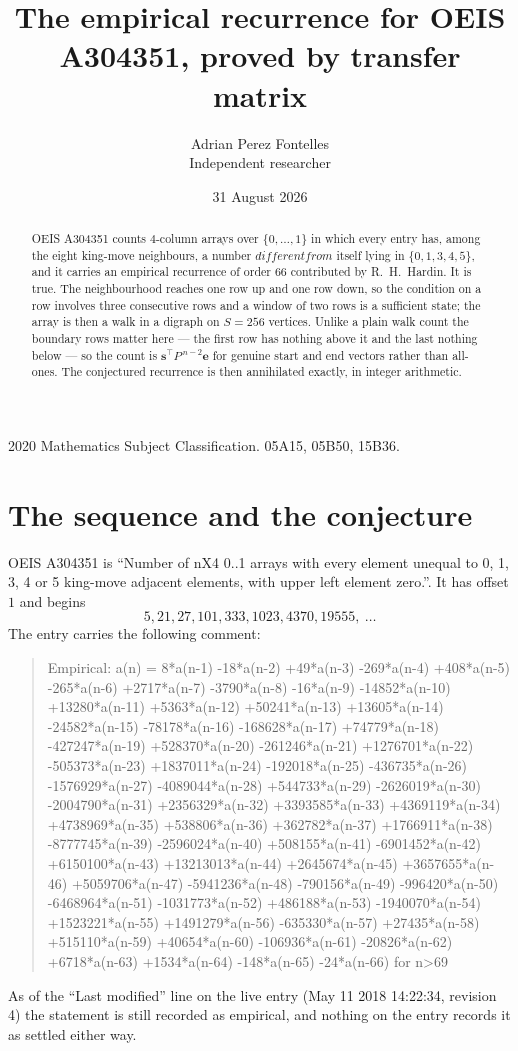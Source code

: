 \documentclass[11pt,a4paper]{article}
\title{The empirical recurrence for OEIS A304351, proved by transfer matrix}
\author{Adrian Perez Fontelles\\ \small Independent researcher}
\date{31 August 2026}
\theoremstyle{plain}
\theoremstyle{definition}
\begin{document}
\maketitle

\begin{abstract}
OEIS A304351 counts $4$-column arrays over $\{0,\dots,1\}$ in which every entry has,
among the eight king-move neighbours, a number $different from$ itself lying in $\{0,1,3,4,5\}$, and it carries an empirical
recurrence of order $66$ contributed by R.~H.~Hardin. It is true. The neighbourhood
reaches one row up and one row down, so the condition on a row involves three consecutive
rows and a window of two rows is a sufficient state; the array is then a walk in a digraph
on $S=256$ vertices. Unlike a plain walk count the boundary rows matter here --- the first
row has nothing above it and the last nothing below --- so the count is
$\mathbf{s}^{\!\top}P^{\,n-2}\mathbf{e}$ for genuine start and end vectors rather than
all-ones. The conjectured recurrence is then annihilated exactly, in integer arithmetic.
\end{abstract}

\noindent\small 2020 Mathematics Subject Classification. 05A15, 05B50, 15B36.\normalsize

\section{The sequence and the conjecture}

OEIS A304351 is ``Number of nX4 0..1 arrays with every element unequal to 0, 1, 3, 4 or 5 king-move adjacent elements, with upper left element zero.''. It has offset
$1$ and begins
\[
5, 21, 27, 101, 333, 1023, 4370, 19555,\ \dots
\]
The entry carries the following comment:
\begin{quote}\small
Empirical: a(n) = 8*a(n-1) -18*a(n-2) +49*a(n-3) -269*a(n-4) +408*a(n-5) -265*a(n-6) +2717*a(n-7) -3790*a(n-8) -16*a(n-9) -14852*a(n-10) +13280*a(n-11) +5363*a(n-12) +50241*a(n-13) +13605*a(n-14) -24582*a(n-15) -78178*a(n-16) -168628*a(n-17) +74779*a(n-18) -427247*a(n-19) +528370*a(n-20) -261246*a(n-21) +1276701*a(n-22) -505373*a(n-23) +1837011*a(n-24) -192018*a(n-25) -436735*a(n-26) -1576929*a(n-27) -4089044*a(n-28) +544733*a(n-29) -2626019*a(n-30) -2004790*a(n-31) +2356329*a(n-32) +3393585*a(n-33) +4369119*a(n-34) +4738969*a(n-35) +538806*a(n-36) +362782*a(n-37) +1766911*a(n-38) -8777745*a(n-39) -2596024*a(n-40) +508155*a(n-41) -6901452*a(n-42) +6150100*a(n-43) +13213013*a(n-44) +2645674*a(n-45) +3657655*a(n-46) +5059706*a(n-47) -5941236*a(n-48) -790156*a(n-49) -996420*a(n-50) -6468964*a(n-51) -1031773*a(n-52) +486188*a(n-53) -1940070*a(n-54) +1523221*a(n-55) +1491279*a(n-56) -635330*a(n-57) +27435*a(n-58) +515110*a(n-59) +40654*a(n-60) -106936*a(n-61) -20826*a(n-62) +6718*a(n-63) +1534*a(n-64) -148*a(n-65) -24*a(n-66) for n>69
\end{quote}
As of the ``Last modified'' line on the live entry (May 11 2018 14:22:34, revision
4) the statement is still recorded as empirical, and nothing on the entry
records it as settled either way.
\end{document}
